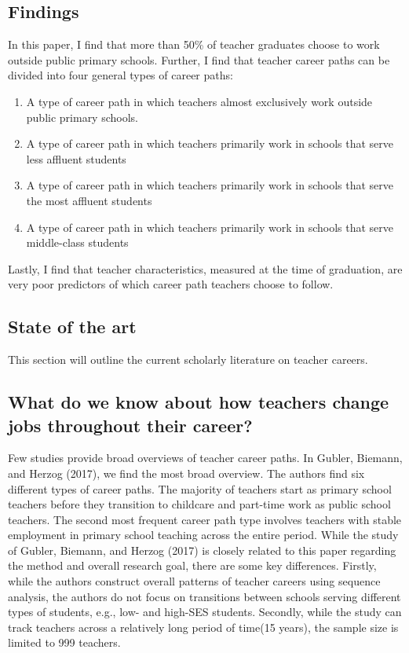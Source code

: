 \documentclass[
]{article}
\begin{document}
\hypertarget{findings}{%
\subsection{Findings}\label{findings}}

In this paper, I find that more than 50\% of teacher graduates choose to work outside public primary schools. Further, I find that teacher career paths can be divided into four general types of career paths:

\begin{enumerate}
\def\labelenumi{\arabic{enumi})}
\item
  A type of career path in which teachers almost exclusively work outside public primary schools.
\item
  A type of career path in which teachers primarily work in schools that serve less affluent students
\item
  A type of career path in which teachers primarily work in schools that serve the most affluent students
\item
  A type of career path in which teachers primarily work in schools that serve middle-class students
\end{enumerate}

Lastly, I find that teacher characteristics, measured at the time of graduation, are very poor predictors of which career path teachers choose to follow.

\hypertarget{state-of-the-art}{%
\subsection{State of the art}\label{state-of-the-art}}

This section will outline the current scholarly literature on teacher careers.

\hypertarget{what-do-we-know-about-how-teachers-change-jobs-throughout-their-career}{%
\subsection{What do we know about how teachers change jobs throughout their career?}\label{what-do-we-know-about-how-teachers-change-jobs-throughout-their-career}}

Few studies provide broad overviews of teacher career paths. In Gubler, Biemann, and Herzog (2017), we find the most broad overview. The authors find six different types of career paths. The majority of teachers start as primary school teachers before they transition to childcare and part-time work as public school teachers. The second most frequent career path type involves teachers with stable employment in primary school teaching across the entire period. While the study of Gubler, Biemann, and Herzog (2017) is closely related to this paper regarding the method and overall research goal, there are some key differences. Firstly, while the authors construct overall patterns of teacher careers using sequence analysis, the authors do not focus on transitions between schools serving different types of students, e.g., low- and high-SES students. Secondly, while the study can track teachers across a relatively long period of time(15 years), the sample size is limited to 999 teachers.
\end{document}

